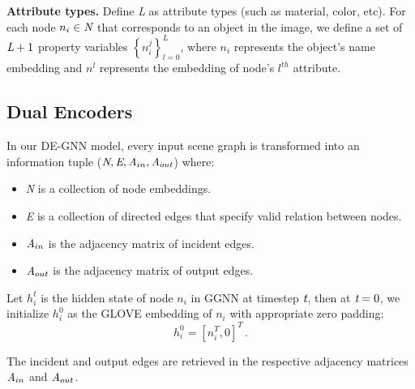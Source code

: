 \documentclass[letterpaper]{article} %
\begin{document}
\medskip
\textbf{Attribute types.} Define \emph{L} as attribute types (such as material, color, etc). 
For each node $n_i\in\emph{N}$ that corresponds to an object in the image, we define a set of $\emph{L}+1$ property variables ${\left\{ n_i^j\right\}}_{l=0}^L$, where $n_i$ represents the object's name embedding and $n^l$ represents the embedding of node's $l^{th}$ attribute.

\subsection{Dual Encoders}

In our DE-GNN model, every input scene graph is transformed into an information tuple ($\emph{N}, \emph{E}, \emph{A}_{in}, \emph{A}_{out}$) where:
\begin{itemize}
    \item \emph{N} is a collection of node embeddings.
    \item \emph{E} is a collection of directed edges that specify valid relation between nodes.
    \item $\emph{A}_{in}$ is the adjacency matrix of incident edges.
    \item $\emph{A}_{out}$ is the adjacency matrix of output edges.
\end{itemize}

Let $h_i^t$ is the hidden state of node $n_i$ in GGNN at timestep $\emph{t}$, then at $\emph{t}=0$, we initialize $h_i^0$ as the GLOVE embedding of $n_i$ with appropriate zero padding:
\begin{equation}
    h_i^0 = [n_i^T, 0]^T  \, .
\end{equation}

The incident and output edges are retrieved in the respective adjacency matrices $\emph{A}_{in}$ and $\emph{A}_{out}$. 
\end{document}
